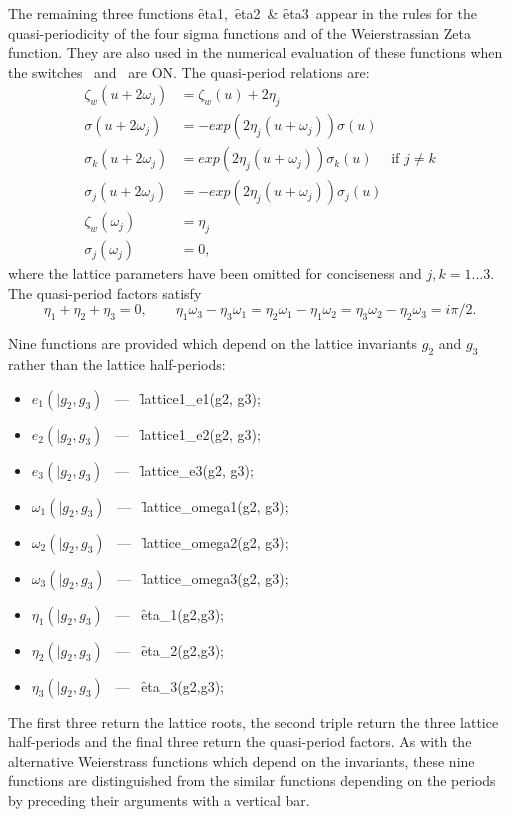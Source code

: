 \hypertarget{operator:ETA1}{}
\hypertarget{operator:ETA2}{}
\hypertarget{operator:ETA3}{}
The remaining three functions \f{eta1},\ \f{eta2}\ \& \f{eta3}\ appear in
the rules for the quasi-periodicity of the four sigma functions and of the
Weierstrassian Zeta function. They are also used in the numerical
evaluation of these functions when the switches \ and \
are ON. The quasi-period relations are:
\begin{align*}
  \zeta_w(u+2\omega_j) & = \zeta_w(u)+2\eta_j\\
  \sigma(u+2\omega_j) & = -exp(2\eta_j(u+\omega_j))\sigma(u)\\
  \sigma_k(u+2\omega_j) & =  exp(2\eta_j(u+\omega_j))\sigma_k(u) \quad\text{  if  }j\neq k\\
  \sigma_j(u+2\omega_j) & = -exp(2\eta_j(u+\omega_j))\sigma_j(u)\\
  \zeta_w(\omega_j) & = \eta_j\\
  \sigma_j(\omega_j) & = 0,
\end{align*}
where the lattice parameters have been omitted for conciseness and $j,k = 1\ldots 3$.
The quasi-period factors satisfy
\[\eta_1+\eta_2+\eta_3=0,\qquad
   \eta_1\omega_3-\eta_3\omega_1=\eta_2\omega_1-\eta_1\omega_2=\eta_3\omega_2-\eta_2\omega_3=i\pi/2.\]

Nine functions are provided which depend on the lattice invariants $g_2$ and
$g_3$ rather than the lattice half-periods:
\begin{itemize}
\item $e_1(|g_2, g_3)$ \ --- \ \f{lattice1\_e1(g2, g3)};
\item $e_2(|g_2, g_3)$ \ --- \ \f{lattice1\_e2(g2, g3)};
\item $e_3(|g_2, g_3)$ \ --- \ \f{lattice\_e3(g2, g3)};
\item $\omega_1(|g_2,g_3)$ \ --- \ \f{lattice\_omega1(g2, g3)};
\item $\omega_2(|g_2,g_3)$ \ --- \ \f{lattice\_omega2(g2, g3)};
\item $\omega_3(|g_2,g_3)$ \ --- \ \f{lattice\_omega3(g2, g3)};
\item $\eta_1(|g_2,g_3)$ \ --- \ \f{eta\_1(g2,g3)};
\item $\eta_2(|g_2,g_3)$ \ --- \ \f{eta\_2(g2,g3)};
\item $\eta_3(|g_2,g_3)$ \ --- \ \f{eta\_3(g2,g3)};
\end{itemize}
The first three return the lattice roots, the second triple return the
three lattice half-periods and the final three return the quasi-period factors.
As with the alternative Weierstrass functions which depend on the invariants,
these nine functions are distinguished from the similar functions depending
on the periods by preceding their arguments with a vertical bar.

